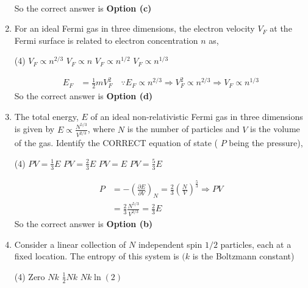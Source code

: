 \begin{enumerate}
\begin{answer}
\begin{align*}
		\end{align*}
		So the correct answer is \textbf{Option (c)}
	\end{answer}
	\item For an ideal Fermi gas in three dimensions, the electron velocity $V_{F}$ at the Fermi surface is related to electron concentration $n$ as,
	{}
	\begin{tasks}(4)
		\task[\textbf{a.}] $V_{F} \propto n^{2 / 3}$
		\task[\textbf{b.}]  $V_{F} \propto n$
		\task[\textbf{c.}] $V_{F} \propto n^{1 / 2}$
		\task[\textbf{d.}] $V_{F} \propto n^{1 / 3}$
	\end{tasks}
	\begin{answer}
		\begin{align*}
		E_{F}&=\frac{1}{2} m V_{F}^{2} \quad \because E_{F} \propto n^{2 / 3} \Rightarrow V_{F}^{2} \propto n^{2 / 3} \Rightarrow V_{F} \propto n^{1 / 3}
		\end{align*}
		So the correct answer is \textbf{Option (d)}
	\end{answer}
	\item The total energy, $E$ of an ideal non-relativistic Fermi gas in three dimensions is given by $E \propto \frac{N^{5 / 3}}{V^{2 / 3}}$, where $N$ is the number of particles and $V$ is the volume of the gas. Identify the CORRECT equation of state ( $P$ being the pressure),
	{}
	\begin{tasks}(4)
		\task[\textbf{a.}] $P V=\frac{1}{3} E$
		\task[\textbf{b.}] $P V=\frac{2}{3} E$
		\task[\textbf{c.}] $P V=E$
		\task[\textbf{d.}] $P V=\frac{5}{3} E$
	\end{tasks}
	\begin{answer}
		\begin{align*}
		P&=-\left(\frac{\partial E}{\partial V}\right)_{N}=\frac{2}{3}\left(\frac{N}{V}\right)^{\frac{5}{3}} \Rightarrow P V\\&=\frac{2}{3} \frac{N^{5 / 3}}{V^{2 / 3}}=\frac{2}{3} E
		\end{align*}
		So the correct answer is \textbf{Option (b)}
	\end{answer}
	\item Consider a linear collection of $N$ independent spin $1 / 2$ particles, each at a fixed location. The entropy of this system is $(k$ is the Boltzmann constant)
	{}
	\begin{tasks}(4)
		\task[\textbf{a.}] Zero
		\task[\textbf{b.}]  $N k$
		\task[\textbf{b.}]  $\frac{1}{2} N k$
		\task[\textbf{c.}] $N k \ln (2)$
	\end{tasks}

\end{enumerate}
